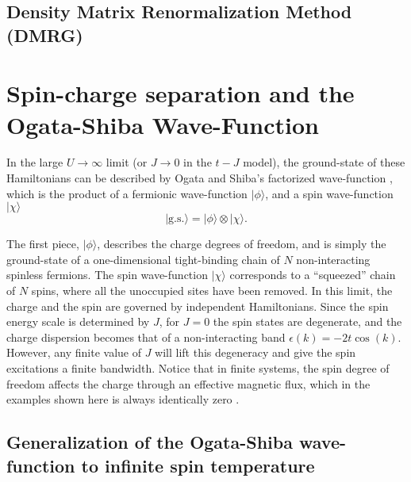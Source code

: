 \documentclass[article,11pt]{revtex4}
\begin{document}
\subsection {Density Matrix Renormalization Method (DMRG)}

\pagebreak
\section {Spin-charge separation and the Ogata-Shiba Wave-Function}

In the large $U \rightarrow \infty$ limit (or $J \rightarrow 0$ in the $t-J$ model), the ground-state of these Hamiltonians can be described by Ogata and Shiba's factorized wave-function \cite{Ogata1990},
which is the product of a fermionic wave-function $|\phi\rangle$, and a spin wave-function
$|\chi\rangle$
\begin{equation}
|\mathrm{g.s.}\rangle=|\phi\rangle\otimes |\chi\rangle.
\label{gs}
\end{equation}

The first piece, $|\phi\rangle$, describes the charge degrees of freedom, and is
simply the ground-state of a one-dimensional tight-binding chain of $N$ non-interacting spinless fermions. The spin wave-function $|\chi\rangle$ corresponds to a ``squeezed'' chain of $N$ spins, where all the unoccupied sites have been removed.
In this limit, 
the charge and the spin are governed by independent Hamiltonians.
Since the spin energy scale is determined by $J$, for $J=0$ the spin states are degenerate, and the charge dispersion becomes that of a non-interacting band $\epsilon(k)=-2t\cos(k)$. However, any finite value of $J$ will lift this degeneracy and give the spin excitations a finite bandwidth. Notice that in finite systems, the spin degree of freedom affects the charge through an effective magnetic flux, which in the examples shown here is always identically zero \cite{Caspers1989,Penc1997,Rincon2009}.

\subsection {Generalization of the Ogata-Shiba wave-function to infinite spin temperature}
\end{document}
